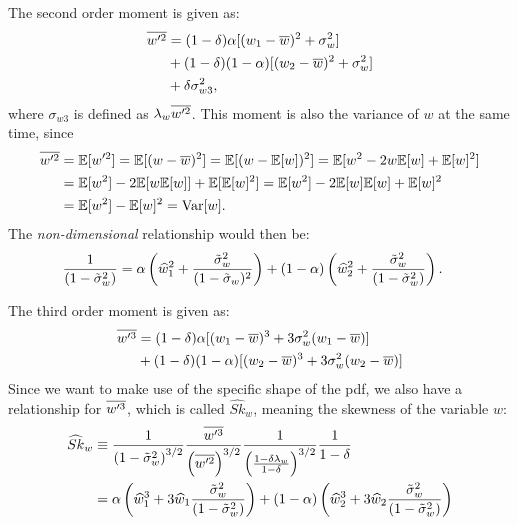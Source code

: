 The second order moment is given as:
\begin{align}
    \label{eq:wp2_bar}
    \overline{w'^2}
    &= (1 - \delta) \alpha [(w_1 - \overline{w})^2 + \sigma_w^2] \nonumber\\
    &+ (1 - \delta) (1 - \alpha) [(w_2 - \overline{w})^2 + \sigma_w^2] \nonumber\\
    &+ \delta \sigma_{w 3}^2,
\end{align}
where $\sigma_{w 3}$ is defined as $\lambda_w \overline{w'^2}$.
This moment is also the variance of $w$ at the same time, since
\begin{align*}
    \overline{w'^2}
    &= \mathbb{E}[w'^2]
    = \mathbb{E}[(w - \overline{w})^2]
    = \mathbb{E}[(w - \mathbb{E}[w])^2]
    = \mathbb{E}[w^2 -2w\mathbb{E}[w] + \mathbb{E}[w]^2] \\
    &= \mathbb{E}[w^2] - 2\mathbb{E}[w\mathbb{E}[w]] + \mathbb{E}[\mathbb{E}[w]^2]
    = \mathbb{E}[w^2] - 2\mathbb{E}[w]\mathbb{E}[w] + \mathbb{E}[w]^2 \\
    &= \mathbb{E}[w^2] - \mathbb{E}[w]^2
    = \text{Var}[w].
\end{align*}
The \emph{non-dimensional} relationship would then be:
\begin{align}
    \label{eq:wp2_bar_non_dim}
    \frac{1}{\left( 1 - \tilde{\sigma}_w^2 \right)}
    &= \alpha \left(\widehat{w}_1^2 + \frac{{\tilde{\sigma}_w}^2}{(1 - {\tilde{\sigma}_w})^2} \right)
    + (1-\alpha) \left( \widehat{w}_2^2 + \frac{{\tilde{\sigma}_w}^2}{\left( 1 - \tilde{\sigma}_w^2 \right)} \right).
\end{align}

The third order moment is given as:
\begin{align}
    \label{eq:wp3_bar}
    \overline{w'^3}
    &= (1 - \delta) \alpha [(w_1 - \overline{w})^3 + 3 \sigma_w^2 (w_1 - \overline{w})] \nonumber\\
    &+ (1 - \delta) (1 - \alpha) [(w_2 - \overline{w})^3 + 3 \sigma_w^2 (w_2 - \overline{w})]
\end{align}
Since we want to make use of the specific shape of the \gls{pdf},
we also have a relationship for $\overline{w'^3}$,
which is called $\widehat{Sk}_w$, meaning the skewness of the variable $w$:
\begin{align}
    \widehat{Sk}_w
    &\equiv \frac{1}{\left( 1 - \tilde{\sigma}_w^2 \right)^{3/2}}
    \frac{\overline{w'^3}}{\left( \overline{w'^2} \right)^{3/2}}
    \frac{1}{\left(\frac{1-\delta \lambda_w}{1-\delta}\right)^{3/2}}
    \frac{1}{1-\delta} \nonumber \\
    &= \alpha \left(\widehat{w}_1^3 + 3 \widehat{w}_1 \frac{{\tilde{\sigma}_w}^2}{\left( 1 - \tilde{\sigma}_w^2 \right)} \right) +
    (1 - \alpha) \left( \widehat{w}_2^3 + 3 \widehat{w}_2 \frac{{\tilde{\sigma}_w}^2}{\left( 1 - \tilde{\sigma}_w^2 \right)} \right)
    \label{eq:sk_hat_w_nondim}
\end{align}

